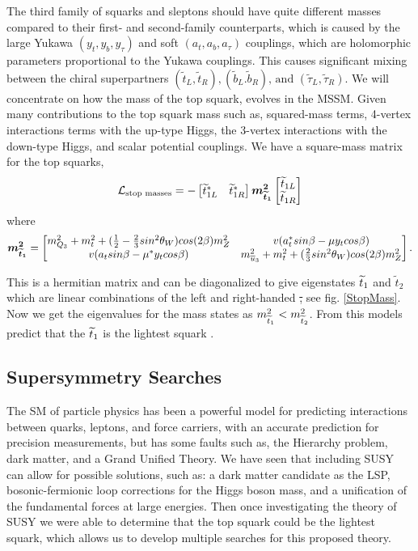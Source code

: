 The third family of squarks and sleptons should have quite different masses compared to their first- and second-family counterparts, which is caused by the large Yukawa $(y_t, y_b, y_\tau)$ and soft $(a_t, a_b, a_\tau)$ couplings, which are holomorphic parameters proportional to the Yukawa couplings. This causes significant mixing between the chiral superpartners $(\widetilde{t}_L, \widetilde{t}_R), (\widetilde{b}_L. \widetilde{b}_R)\text{, and } (\widetilde{\tau}_L, \widetilde{\tau}_R)$. We will concentrate on how the mass of the top squark, \st{} evolves in the MSSM. Given many contributions to the top squark mass such as, squared-mass terms, 4-vertex interactions terms with the up-type Higgs, the 3-vertex interactions with the down-type Higgs, and scalar potential couplings. We have a square-mass matrix for the top squarks, 
\begin{equation}
\mathcal{L}_{\text{stop masses}}=-
\begin{bmatrix}
\widetilde{t}_{1L}^* & \widetilde{t}_{1R}^* \\
\end{bmatrix}
\boldsymbol{m_{\widetilde{t}_1}^2}
\begin{bmatrix}
\widetilde{t}_{1L} \\
\widetilde{t}_{1R} \\
\end{bmatrix}
\end{equation}
where 
\begin{equation}
\boldsymbol{m_{\widetilde{t}_1}^2}=
\begin{bmatrix}
m_{Q_3}^2+m_t^2+(\frac{1}{2}-\frac{2}{3}sin^2\theta_W)cos(2\beta)m_Z^2 & v(a_t^*sin\beta-\mu y_tcos\beta) \\
v(a_tsin\beta-\mu^*y_tcos\beta) & m^2_{\overline{u}_3} +m_t^2+(\frac{2}{3}sin^2\theta_W)cos(2\beta)m^2_Z \\ 
\end{bmatrix}.
\end{equation}

This is a hermitian matrix and can be diagonalized to give eigenstates $\widetilde{t}_1$ and $\widetilde{t}_2$ which are linear combinations of the left and right-handed \st, see fig. \ref{StopMass}. Now we get the eigenvalues for the mass states as $m_{\widetilde{t}_1}^2<m_{\widetilde{t}_2}^2$. From this models predict that the $\widetilde{t}_1$ is the lightest squark \cite{martin_supersymmetry_1997}. 

\subsection{Supersymmetry Searches}
The SM of particle physics has been a powerful model for predicting interactions between quarks, leptons, and force carriers, with an accurate prediction for precision measurements, but has some faults such as, the Hierarchy problem, dark matter, and a Grand Unified Theory. We have seen that including SUSY can allow for possible solutions, such as: a dark matter candidate as the LSP, bosonic-fermionic loop corrections for the Higgs boson mass, and a unification of the fundamental forces at large energies. Then once investigating the theory of SUSY we were able to determine that the top squark could be the lightest squark, which allows us to develop multiple searches for this proposed theory. 

